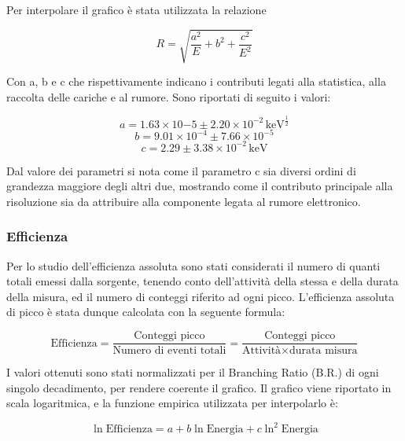 \documentclass[a4paper,10pt]{article}
\newcommand*{\unit}[1]{\ensuremath{\mathrm{\,#1}}}
\begin{document}
\noindent Per interpolare il grafico \`e stata utilizzata la relazione

\begin{equation}
	R=\sqrt{\frac{a^2}{E}+b^2+\frac{c^2}{E^2}}
\end{equation}

\noindent Con a, b e c che rispettivamente indicano i contributi legati alla statistica, alla raccolta delle cariche e al rumore. Sono riportati di seguito i valori:

$$
	a=1.63 \times 10{-5} \pm 2.20 \times 10^{-2} \unit{keV^{\frac{1}{2}}}
$$
$$
	b=9.01 \times 10^{-4} \pm 7.66 \times 10^{-5}
$$
$$
	c= 2.29 \pm 3.38 \times 10^{-2} \unit{keV}
$$

\noindent Dal valore dei parametri si nota come il parametro c sia diversi ordini di grandezza maggiore degli altri due, mostrando come il contributo principale alla risoluzione sia da attribuire alla componente legata al rumore elettronico.


\subsubsection{Efficienza}
Per lo studio dell'efficienza assoluta sono stati considerati il numero di quanti totali emessi dalla sorgente, tenendo conto dell'attivit\`a della stessa e della durata della misura, ed il numero di conteggi riferito ad ogni picco. L'efficienza assoluta di picco \`e stata dunque calcolata con la seguente formula:

\begin{equation}
	\textrm{Efficienza}=\frac{\textrm{Conteggi picco}}{\textrm{Numero di eventi totali}}=\frac{\textrm{Conteggi picco}}{\textrm{Attivit\`a} \times \textrm{durata misura}}
\end{equation}

\noindent I valori ottenuti sono stati normalizzati per il Branching Ratio (B.R.) di ogni singolo decadimento, per rendere coerente il grafico. Il grafico viene riportato in scala logaritmica, e la funzione empirica utilizzata per interpolarlo \`e:

\begin{equation}
	\ln{\textrm{Efficienza}}=a + b\ln{\textrm{Energia}} + c\ln^{2}{\textrm{Energia}}
\end{equation}
\end{document}
